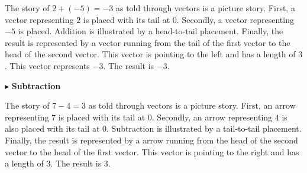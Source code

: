 \documentclass{ximera}
\begin{document}
The story of $2+(-5)=-3$ as told through vectors is a picture story.  First, a vector representing $2$ is placed with its tail at $0$.  Secondly, a vector representing $-5$ is placed.  Addition is illustrated by a head-to-tail placement.  Finally, the result is represented by a vector running from the tail of the first vector to the head of the second vector. This vector is pointing to the left and has a length of $3$.  This vector represents $-3$. The result is $-3$.




  \begin{image}
  \end{image}















$\blacktriangleright$ \textbf{Subtraction}





The story of $7 - 4 = 3$ as told through vectors is a picture story.  First, an arrow representing $7$ is placed with its tail at $0$.  Secondly, an arrow representing $4$ is also placed with its tail at $0$.  Subtraction is illustrated by a tail-to-tail placement.  Finally, the result is represented by a arrow running from the head of the second vector to the head of the first vector. This vector is pointing to the right and has a length of $3$.  The result is $3$.
\end{document}
